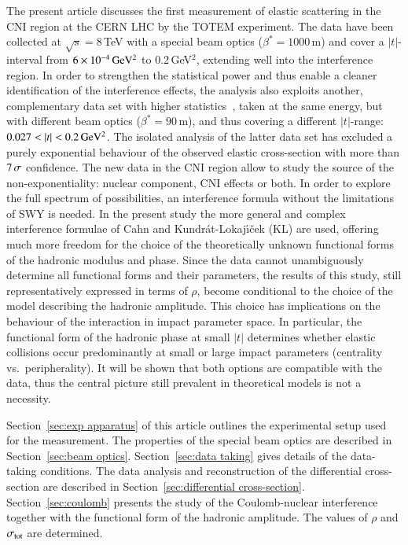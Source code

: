 The present article discusses the first measurement of elastic scattering in the CNI region at the CERN LHC by the TOTEM experiment. The data have been collected at $\sqrt{s} = 8\,$TeV with a special beam optics ($\beta^{*}=1000\,$m) and cover a $|t|$-interval from $6\times10^{-4}\,\rm GeV^{2}$ to 0.2\,GeV$^{2}$, extending well into the interference region. In order to strengthen the statistical power and thus enable a cleaner identification of the interference effects, the analysis also exploits another, complementary data set with higher statistics~\cite{8tev-90m}, taken at the same energy, but with different beam optics ($\beta^{*}=90\,$m), and thus covering a different $|t|$-range: $0.027 < |t| < 0.2\,{\rm GeV^2}$. The isolated analysis of the latter data set has excluded a purely exponential behaviour of the observed elastic cross-section with more than $7\,{\rm \sigma}$ confidence. The new data in the CNI region allow to study the source of the non-exponentiality: nuclear component, CNI effects or both. In order to explore the full spectrum of possibilities, an interference formula without the limitations of SWY is needed. In the present study the more general and complex interference formulae of Cahn \cite{cahn82} and Kundr\'{a}t-Lokaj\'{\i}\v{c}ek (KL) \cite{kl94} are used, offering much more freedom for the choice of the theoretically unknown functional forms of the hadronic modulus and phase. Since the data cannot unambiguously determine all functional forms and their parameters, the results of this study, still representatively expressed in terms of $\rho$, become conditional to the choice of the model describing the hadronic amplitude. This choice has implications on the behaviour of the interaction in impact parameter space. In particular, the functional form of the hadronic phase at small $|t|$ determines whether elastic collisions occur predominantly at small or large impact parameters (centrality vs.~peripherality). It will be shown that both options are compatible with the data, thus the central picture still prevalent in theoretical models is not a necessity.

Section~\ref{sec:exp apparatus} of this article outlines the experimental setup used for the measurement. The properties of the special beam optics are described in Section~\ref{sec:beam optics}. Section~\ref{sec:data taking} gives details of the data-taking conditions. The data analysis and reconstruction of the differential cross-section are described in Section~\ref{sec:differential cross-section}. Section~\ref{sec:coulomb} presents the study of the Coulomb-nuclear interference together with the functional form of the hadronic amplitude. The values of $\rho$ and $\sigma_{\rm tot}$ are determined.
